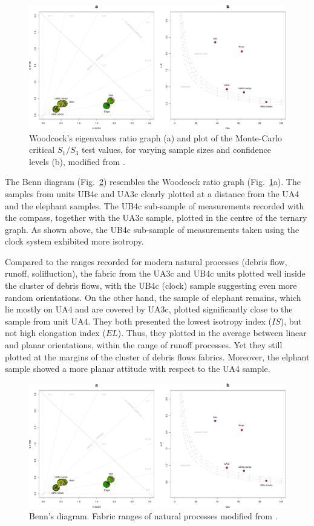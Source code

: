 \documentclass[review,authoryear,times]{elsarticle} %
\begin{document}
\begin{figure}[]
  \centering
  \includegraphics[width=1\textwidth]{../artwork/Fig5_.pdf}
  \caption{Woodcock's eigenvalues ratio graph (a) and plot of the Monte-Carlo critical $S_1/S_3$ test values, for varying sample sizes and confidence levels (b), modified from \cite{Woodcock1983}.}
  \label{fig:5}
\end{figure}

The Benn diagram (Fig.~\ref{fig:6}) resembles the Woodcock ratio graph (Fig.~\ref{fig:5}a). The samples from units UB4c and UA3c clearly plotted at a distance from the UA4 and the elephant samples. The UB4c sub-sample of measurements recorded with the compass, together with the UA3c sample, plotted in the centre of the ternary graph. As shown above, the UB4c sub-sample of measurements taken using the clock system exhibited more isotropy.

Compared to the ranges recorded for modern natural processes (debris flow, runoff, solifluction), the fabric from the UA3c and UB4c units plotted well inside the cluster of debris flows, with the UB4c (clock) sample suggesting even more random orientations. On the other hand, the sample of elephant remains, which lie mostly on UA4 and are covered by UA3c, plotted significantly close to the sample from unit UA4. They both presented the lowest isotropy index ($IS$), but not high elongation index ($EL$). Thus, they plotted in the average between linear and planar orientations, within the range of runoff processes. Yet they still plotted at the margins of the cluster of debris flows fabrics. Moreover, the elphant sample showed a more planar attitude with respect to the UA4 sample.

\begin{figure}[]
  \centering
  \includegraphics[width=1\textwidth]{../artwork/Fig6_.pdf}
  \caption{Benn's diagram. Fabric ranges of natural processes modified from \cite{Bertran1997,Lenoble2004}.}
  \label{fig:6}
\end{figure}
\end{document}

